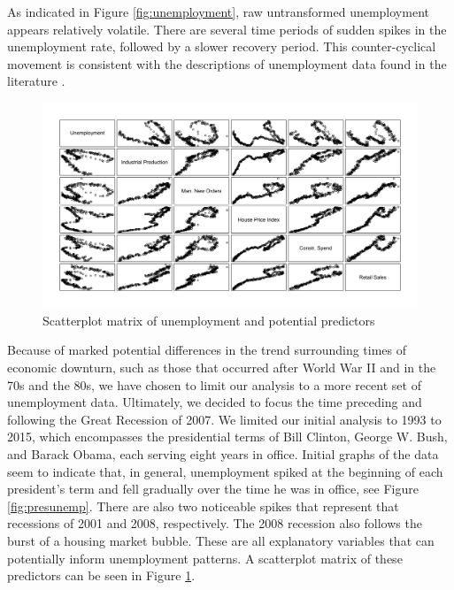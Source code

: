\documentclass[twoside,twocolumn]{article}
\begin{document}
As indicated in Figure  \ref{fig:unemployment}, raw untransformed unemployment appears relatively volatile.  There are several time periods of sudden spikes in the unemployment rate, followed by a slower recovery period. This counter-cyclical movement is consistent with the descriptions of unemployment data found in the literature \citep{katz2010, Montgomery1998, shimer2012reassessing}.

		\begin{figure}[htb]
		\caption{Scatterplot matrix of unemployment and potential predictors}
		\label{fig:pred_scatt}
		\includegraphics[width=\linewidth]{images/pred_scatt}
	\end{figure}

Because of marked potential differences in the trend surrounding times of economic downturn, such as those that occurred after World War II and in the 70s and the 80s, we have chosen to limit our analysis to a more recent set of unemployment data. Ultimately, we decided to focus the time preceding and following the Great Recession of 2007. We limited our initial analysis to 1993 to 2015, which encompasses the presidential terms of Bill Clinton, George W. Bush, and Barack Obama, each serving eight years in office.  Initial graphs of the data seem to indicate that, in general, unemployment spiked at the beginning of each president's term and fell gradually over the time he was in office, see Figure \ref{fig:presunemp}. There are also two noticeable spikes that represent that recessions of 2001 and 2008, respectively.  The 2008 recession also follows the burst of a housing market bubble.  These are all explanatory variables that can potentially inform unemployment patterns. A scatterplot matrix  of these predictors can be seen in Figure \ref{fig:pred_scatt}.

\end{document}
